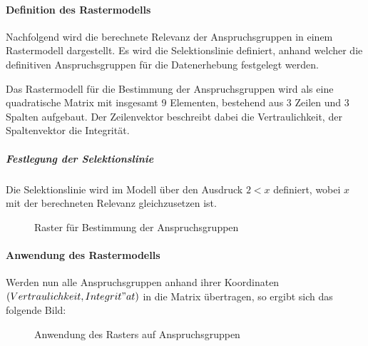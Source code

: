 \documentclass[../../main.tex]{subfiles}
\begin{document}
\newpage

\paragraph*{Definition des Rastermodells}\mbox{}

\begin{sloppypar}
Nachfolgend wird die berechnete Relevanz der Anspruchsgruppen in einem Rastermodell dargestellt. Es wird die Selektionslinie definiert, anhand welcher die definitiven Anspruchsgruppen für die Datenerhebung festgelegt werden. 
\end{sloppypar}

\begin{sloppypar}
Das Rastermodell für die Bestimmung der Anspruchsgruppen wird als eine quadratische Matrix mit insgesamt 9 Elementen, bestehend aus 3 Zeilen und 3 Spalten aufgebaut. Der Zeilenvektor beschreibt dabei die Vertraulichkeit, der Spaltenvektor die Integrität.
\end{sloppypar}

\subparagraph*{Festlegung der Selektionslinie}\mbox{}

\begin{sloppypar}
Die Selektionslinie wird im Modell über den Ausdruck $2 < x$ definiert, wobei $x$ mit der berechneten Relevanz gleichzusetzen ist.
\end{sloppypar}

\begin{figure}[H]
    \centering
    
    \caption{Raster für Bestimmung der Anspruchsgruppen}
    \label{fig:raster1}
\end{figure}

\newpage

\paragraph*{Anwendung des Rastermodells}\mbox{}

\begin{sloppypar}
Werden nun alle Anspruchsgruppen anhand ihrer Koordinaten $(Vertraulichkeit,Integrit"at)$ in die Matrix übertragen, so ergibt sich das folgende Bild:
\end{sloppypar} 

\begin{figure}[H]
    
    \caption{Anwendung des Rasters auf Anspruchsgruppen}
    \label{fig:raster2}
\end{figure}
\end{document}
